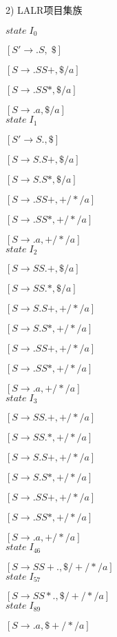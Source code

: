 \documentclass[a4paper, 10pt]{article}
\begin{document}
2) LALR项目集族



$state \; I_0$

$[S'\rightarrow .S, \;\$]$

$[S \rightarrow .SS+ , \$/a]$

$[S \rightarrow .SS* , \$/a]$


$[S \rightarrow .a , \$/a]$\\

$state \; I_1$


$[S' \rightarrow S. , \$]$

$[S \rightarrow S.S+ , \$/a]$

$[S \rightarrow S.S* , \$/a]$

$[S \rightarrow .SS+ , +/*/a]$

$[S \rightarrow .SS* , +/*/a]$

$[S \rightarrow .a , +/*/a]$\\

$state \; I_2$

$[S \rightarrow SS.+ , \$/a]$

$[S \rightarrow SS.* , \$/a]$

$[S \rightarrow S.S+ , +/*/a]$

$[S \rightarrow S.S* , +/*/a]$

$[S \rightarrow .SS+ , +/*/a]$

$[S \rightarrow .SS* , +/*/a]$

$[S \rightarrow .a , +/*/a]$\\

$state \; I_3$

$[S \rightarrow SS.+ , +/*/a]$

$[S \rightarrow SS.* , +/*/a]$

$[S \rightarrow S.S+ , +/*/a]$

$[S \rightarrow S.S* , +/*/a]$

$[S \rightarrow .SS+ , +/*/a]$

$[S \rightarrow .SS* , +/*/a]$

$[S \rightarrow .a , +/*/a]$\\

$state \; I_{46}$

$[S \rightarrow SS+. , \$/+/*/a]$\\


$state \; I_{57}$

$[S \rightarrow SS*. , \$/+/*/a]$\\


$state \; I_{89}$

$[S \rightarrow .a , \$ +/*/a]$\\
\end{document}
